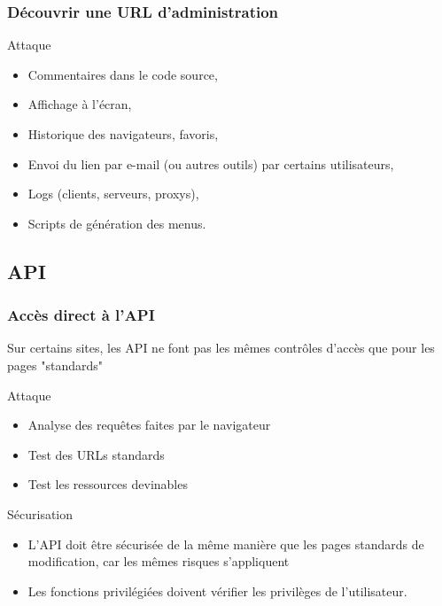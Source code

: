 \documentclass{beamer}
\begin{document}
\begin{frame}
  \frametitle{Découvrir une URL d'administration}
  \begin{alertblock}{Attaque}
    \begin{itemize}
      \item Commentaires dans le code source,
      \item Affichage à l'écran, 
      \item Historique des navigateurs, favoris,
      \item Envoi du lien par e-mail (ou autres outils) par certains utilisateurs,
      \item Logs (clients, serveurs, proxys), 
      \item Scripts de génération des menus.
    \end{itemize}
  \end{alertblock}
\end{frame}
  
\subsection{API}
\begin{frame}
  \frametitle{Accès direct à l'API}
  Sur certains sites, les API ne font pas les mêmes contrôles d'accès que pour les pages "standards"
  \begin{alertblock}{Attaque}
    \begin{itemize}
      \item Analyse des requêtes faites par le navigateur
      \item Test des URLs standards
      \item Test les ressources devinables
    \end{itemize}
  \end{alertblock}
  \begin{exampleblock}{Sécurisation}
    \begin{itemize}
      \item L'API doit être sécurisée de la même manière que les pages standards de modification, car les mêmes risques s'appliquent
      \item Les fonctions privilégiées doivent vérifier les privilèges de l’utilisateur.
    \end{itemize}
  \end{exampleblock}
\end{frame}
\end{document}
